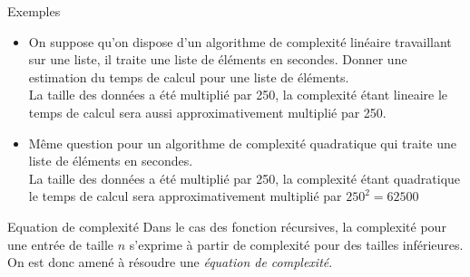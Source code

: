 \documentclass[10pt]{beamer}
\begin{document}
\begin{frame}[fragile]{\Ctitle}{\stitle}
	\begin{exampleblock}{Exemples}
		\begin{itemize}
			\item<1-> On suppose qu'on dispose d'un algorithme de complexité linéaire travaillant sur une liste, il traite une liste de  éléments en  secondes. Donner une estimation du temps de calcul pour une liste de  éléments.\\
				\onslide<2-> {\textcolor{OliveGreen}{La taille des données a été multiplié par 250, la complexité étant lineaire le temps de calcul sera aussi approximativement multiplié par 250. \\}}
				\onslide<3->{\textcolor{OliveGreen}{$0.015 \times 250 = 3.75$, on peut donc prévoir un temps de calcul d'environ 3,75 secondes}}
			\item<4-> Même question pour un algorithme de complexité quadratique qui traite une liste de  éléments en  secondes.\\
				\onslide<5-> {\textcolor{OliveGreen}{La taille des données a été multiplié par 250, la complexité étant quadratique le temps de calcul sera  approximativement multiplié par $250^2=62500$ \\}}
				\onslide<6->{\textcolor{OliveGreen}{$0.07 \times 62\,500 = 4375$, on peut donc prévoir un temps de calcul d'environ $4\,375$ secondes, c'est à dire près d'une heure et 15 minutes !}}
		\end{itemize}
	\end{exampleblock}
\end{frame}

\begin{frame}[fragile]{\Ctitle}{\stitle}
    \begin{block}{Equation de complexité}
        Dans le cas des fonction récursives, la complexité pour une entrée de taille $n$ s'exprime à partir de complexité pour des tailles inférieures. On est donc amené à résoudre une \textit{équation de complexité}.
    \end{block}
\end{frame}
\end{document}
